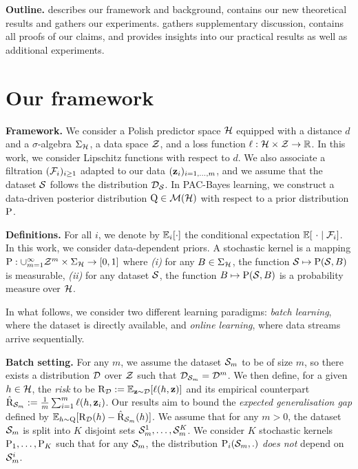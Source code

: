 \textbf{Outline.}  describes our framework and background,  contains our new theoretical results and  gathers our experiments. 
 gathers supplementary discussion,  contains all proofs of our claims, and  provides insights into our practical results as well as additional experiments.

\section{Our framework}
\label{sec:framework}

\textbf{Framework.} 
We consider a Polish predictor space $\H$ equipped with a distance $d$ and a $\sigma$-algebra $\Sigma_{\Hcal}$, a data space $\Z$, and a loss function $\loss : \H\times \Z \rightarrow \R$.
In this work, we consider Lipschitz functions with respect to $d$.
We also associate a filtration $(\Fcal_{i})_{i\geq 1}$ adapted to our data $(\z_i)_{i=1,\dots,m}$, and we assume that the dataset $\S$ follows the distribution $\Dcal_{\S}$.
In PAC-Bayes learning, we construct a data-driven posterior distribution $\Q\in\Mcal(\H)$ with respect to a prior distribution $\P$. 

\textbf{Definitions.} 
For all $i$, we denote by $\EE_{i}[\cdot]$ the conditional expectation $\EE[\ \cdot\mid \Fcal_i]$.
In this work, we consider data-dependent priors.
A stochastic kernel is a mapping $\P: \cup_{m=1}^\infty\Z^m\times \Sigma_{\Hcal} \rightarrow [0,1]$ where {\it (i)} for any $B\in \Sigma_{\Hcal}$, the function  $\S\mapsto \P(\S,B)$ is measurable, {\it (ii)} for any dataset $\S$, the function $B\mapsto \P(\S,B)$ is a probability measure over $\H$.

In what follows, we consider two different learning paradigms: \emph{batch learning}, where the dataset is directly available, and \emph{online learning}, where data streams arrive sequentially.

\textbf{Batch setting.} 
For any $m$, we assume the dataset $\Sm$ to be \iid of size $m$, so there exists a distribution $\D$ over $\Z$ such that $\Dcal_{\Sm}=\D^m$.
We then define, for a given $h\in\H$, the \emph{risk} to be $\Risk_\D\defeq\EE_{\z\sim \D}[\loss(h,\z)]$ and its empirical counterpart $\Riskhat_{\Sm} \defeq \frac{1}{m}\sum_{i=1}^m \loss(h,\z_i)$. 
Our results aim to bound the \emph{expected generalisation gap} defined by $\EE_{h\sim\Q}[ \Risk_{\D}(h) - \Riskhat_{\Sm}(h)]$.
We assume that for any $m>0$, the dataset $\Sm$ is split into $K$ disjoint sets $\Sm^1,\dots,\Sm^K$.
We consider $K$ stochastic kernels  $\P_1,\dots,\P_K$ such that for any $\Sm$, the distribution $\P_{i}(\Sm,.)$ {\it does not} depend on $\Sm^{i}$.

